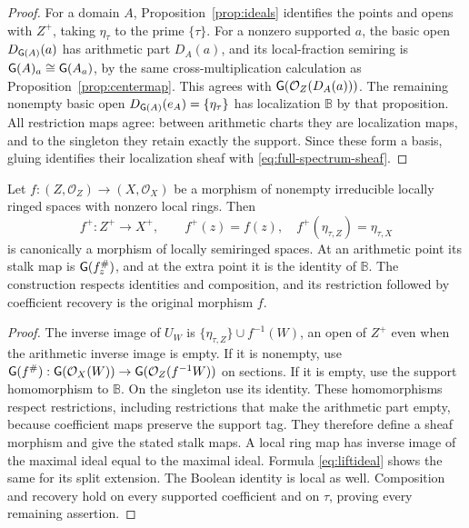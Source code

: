 \begin{proof}
For a domain $A$, Proposition~\ref{prop:ideals} identifies the points
and opens with $Z^+$, taking $\eta_\tau$ to the prime $\{\tau\}$.
For a nonzero supported $a$, the basic open $D_{\mathsf G(A)}(a)$ has
arithmetic part $D_A(a)$, and its local-fraction semiring is
$\mathsf G(A)_a\cong\mathsf G(A_a)$, by the same cross-multiplication calculation
as Proposition~\ref{prop:centermap}. This agrees with
$\mathsf G(\mathcal O_Z(D_A(a)))$. The remaining nonempty basic open
$D_{\mathsf G(A)}(e_A)=\{\eta_\tau\}$ has localization $\mathbb B$ by that
proposition. All restriction maps agree: between arithmetic charts
they are localization maps, and to the singleton they retain exactly
the support. Since these form a basis, gluing identifies their
localization sheaf with \eqref{eq:full-spectrum-sheaf}.
\end{proof}

\begin{proposition}
\label{prop:fullspectralfunctor}
Let $f:(Z,\mathcal O_Z)\to(X,\mathcal O_X)$ be a morphism of nonempty
irreducible locally ringed spaces with nonzero local rings. Then
\[
 f^+:Z^+\longrightarrow X^+,\qquad
 f^+(z)=f(z),\quad f^+(\eta_{\tau,Z})=\eta_{\tau,X}
 \tag{AV6.7}\label{eq:full-morphism}
\]
is canonically a morphism of locally semiringed spaces. At an arithmetic
point its stalk map is $\mathsf G(f_z^\#)$, and at the extra point it is the
identity of $\mathbb B$. The construction respects identities and
composition, and its restriction followed by coefficient recovery
is the original morphism $f$.
\end{proposition}
\begin{proof}
The inverse image of $U_W$ is
$\{\eta_{\tau,Z}\}\cup f^{-1}(W)$, an open of $Z^+$ even when the
arithmetic inverse image is empty. If it is nonempty, use
$\mathsf G(f^\#):\mathsf G(\mathcal O_X(W))\to
\mathsf G(\mathcal O_Z(f^{-1}W))$ on sections. If it is empty, use the support
homomorphism to $\mathbb B$. On the singleton use its identity.
These homomorphisms respect restrictions, including restrictions that
make the arithmetic part empty, because coefficient maps preserve the
support tag. They therefore define a sheaf morphism and give the stated
stalk maps. A local ring map has inverse image of the maximal ideal
equal to the maximal ideal. Formula \eqref{eq:liftideal} shows the same
for its split extension. The Boolean identity is local as well.
Composition and recovery hold on every supported coefficient and on
$\tau$, proving every remaining assertion.
\end{proof}

